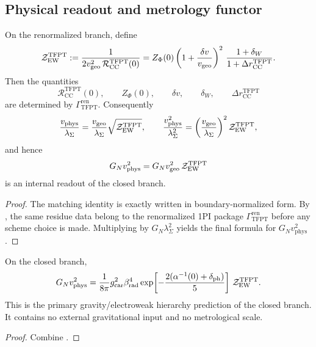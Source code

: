 \subsection{Physical readout and metrology functor}

\begin{theorem}
\label{thm:dimensionless-ew-residue-matching}
On the renormalized branch, define
\[
\mathcal Z_{\mathrm{EW}}^{\mathrm{TFPT}}
:=
\frac{1}{2v_{\mathrm{geo}}^2\,\mathcal R_{\mathrm{CC}}^{\mathrm{TFPT}}(0)}
=
Z_\Phi(0)\left(1+\frac{\delta v}{v_{\mathrm{geo}}}\right)^2
\,\frac{1+\delta_W}{1+\Delta r_{\mathrm{CC}}^{\mathrm{TFPT}}}.
\]
Then the quantities
\[
\mathcal R_{\mathrm{CC}}^{\mathrm{TFPT}}(0),
\qquad
Z_\Phi(0),
\qquad
\delta v,
\qquad
\delta_W,
\qquad
\Delta r_{\mathrm{CC}}^{\mathrm{TFPT}}
\]
are determined by $\Gamma_{\mathrm{TFPT}}^{\mathrm{ren}}$. Consequently
\[
\frac{v_{\mathrm{phys}}}{\lambda_\Sigma}
=
\frac{v_{\mathrm{geo}}}{\lambda_\Sigma}\sqrt{\mathcal Z_{\mathrm{EW}}^{\mathrm{TFPT}}},
\qquad
\frac{v_{\mathrm{phys}}^2}{\lambda_\Sigma^2}
=
\left(\frac{v_{\mathrm{geo}}}{\lambda_\Sigma}\right)^2\mathcal Z_{\mathrm{EW}}^{\mathrm{TFPT}},
\]
and hence
\[
G_Nv_{\mathrm{phys}}^2
=
G_Nv_{\mathrm{geo}}^2\,\mathcal Z_{\mathrm{EW}}^{\mathrm{TFPT}}
\]
is an internal readout of the closed branch.
\end{theorem}

\begin{proof}
The matching identity is exactly  written in
boundary-normalized form. By , the same residue data belong to
the renormalized 1PI package $\Gamma_{\mathrm{TFPT}}^{\mathrm{ren}}$ before any scheme choice is
made. Multiplying by $G_N\lambda_\Sigma^2$ yields the final formula for $G_Nv_{\mathrm{phys}}^2$.
\end{proof}

\begin{corollary}
\label{cor:dimensionless-gravitational-ew-metrology}
On the closed branch,
\[
G_Nv_{\mathrm{phys}}^2
=
\frac{1}{8\pi}g_{\mathrm{car}}^2\beta_{\mathrm{rad}}^4
\exp\!\left[-\frac{2(\alpha^{-1}(0)+\delta_{\mathrm{ph}})}{5}\right]
\,\mathcal Z_{\mathrm{EW}}^{\mathrm{TFPT}}.
\]
This is the primary gravity/electroweak hierarchy prediction of the closed branch. It contains no
external gravitational input and no metrological scale.
\end{corollary}

\begin{proof}
Combine .
\end{proof}

